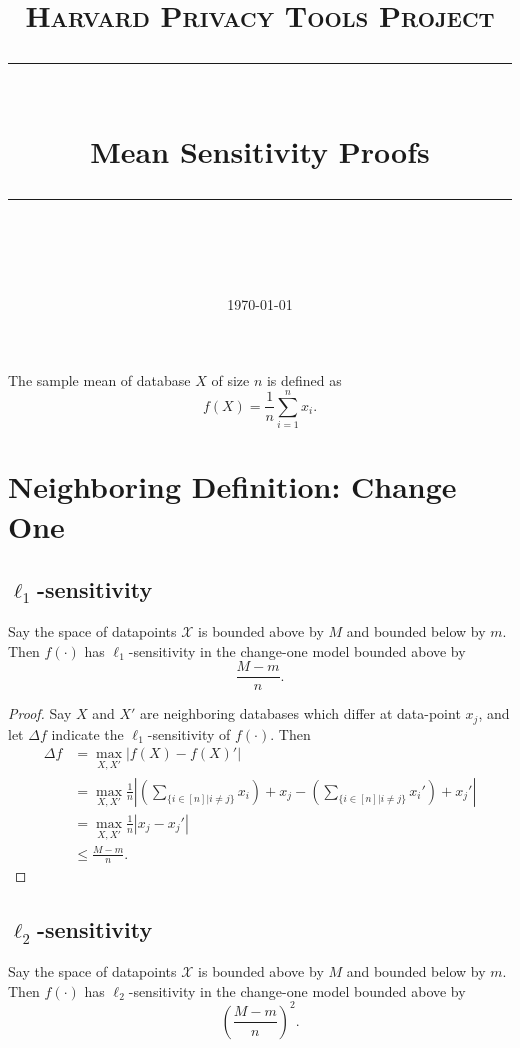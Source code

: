 \documentclass[11pt]{scrartcl} %
\title{
	\normalfont\normalsize
	\textsc{Harvard Privacy Tools Project}\\ %
	\vspace{25pt} %
	\rule{\linewidth}{0.5pt}\\ %
	\vspace{20pt} %
	{\huge Mean Sensitivity Proofs}\\ %
	\vspace{12pt} %
	\rule{\linewidth}{2pt}\\ %
	\vspace{12pt} %
}
\date{\normalsize\today} %
\begin{document}
\maketitle

\begin{definition}
The sample mean of database $X$ of size $n$ is defined as 
$$f(X) = \frac{1}{n} \sum_{i=1}^n x_i.$$
\end{definition}

\section{Neighboring Definition: Change One}

\subsection{$\ell_1$-sensitivity}
\begin{theorem}
Say the space of datapoints $\mathcal{X}$ is bounded above by $M$ and bounded below by $m$. Then $f(\cdot)$ has $\ell_1$-sensitivity in the change-one model bounded above by
$$ \frac{M-m}{n}.$$
\end{theorem}

\begin{proof}
Say $X$ and $X'$ are neighboring databases which differ at data-point $x_j$, and let $\Delta{f}$ indicate the $\ell_1$-sensitivity of $f(\cdot)$. Then
\begin{align*}
\Delta{f} &= \max_{X,X'} \left\vert f(X) - f(X)' \right\vert \\
	&=  \max_{X,X'} \frac{1}{n} \left\vert \left(\sum_{\{ i \in [n] \vert i \ne j\}} x_i\right) + x_j  - \left(\sum_{\{ i \in [n] \vert i \ne j\}} x_i'\right) + x_j'  \right\vert \\
	&= \max_{X,X'} \frac{1}{n} \left\vert x_j - x_j' \right\vert \\
	&\le \frac{M-m}{n}.
\end{align*}
\end{proof}

\subsection{$\ell_2$-sensitivity}
\begin{theorem}
	Say the space of datapoints $\mathcal{X}$ is bounded above by $M$ and bounded below by $m$.
	Then $f(\cdot)$ has $\ell_2$-sensitivity in the change-one model bounded above by
	 $$ \left(\frac{M-m}{n}\right)^2. $$
\end{theorem}
\end{document}
